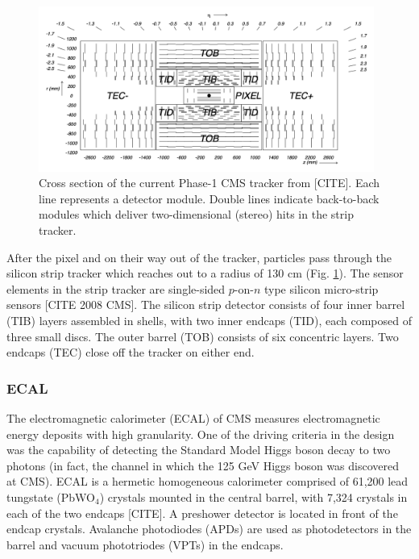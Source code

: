 \documentclass{article}
\begin{document}
\begin{figure}[ht]
    \centering
    \includegraphics[width=11cm]{figures/phase-1-tdr-tracker-schematic.png}
    \caption{Cross section of the current Phase-1 CMS tracker from [CITE]. Each line represents a detector module. Double lines indicate back-to-back modules which deliver two-dimensional (stereo) hits in the strip tracker.}
    \label{fig:phase-1-tdr-tracker-schematic}
\end{figure}



After the pixel and on their way out of the tracker, particles pass through the silicon strip tracker which reaches out to a radius of 130 cm (Fig. \ref{fig:phase-1-tdr-tracker-schematic}). The sensor elements in the strip tracker are single-sided $p$-on-$n$ type silicon micro-strip sensors [CITE 2008 CMS]. The silicon strip detector consists of four inner barrel (TIB) layers assembled in shells, with two inner endcaps (TID), each composed of three small discs. The outer barrel (TOB) consists of six concentric layers. Two endcaps (TEC) close off the tracker on either end. 


\subsubsection{ECAL} 
The electromagnetic calorimeter (ECAL) of CMS measures electromagnetic energy deposits with high granularity. One of the driving criteria in the design was the capability of detecting the Standard Model Higgs boson decay to two photons (in fact, the channel in which the 125 GeV Higgs boson was discovered at CMS). %
ECAL is a hermetic homogeneous calorimeter comprised of 61,200 lead tungstate (PbWO$_4$) crystals mounted in the central barrel, with 7,324 crystals in each of the two endcaps [CITE]. A preshower detector is located in front of the endcap crystals. Avalanche photodiodes (APDs) are used as photodetectors in the barrel and vacuum phototriodes (VPTs) in the endcaps. 
\end{document}
